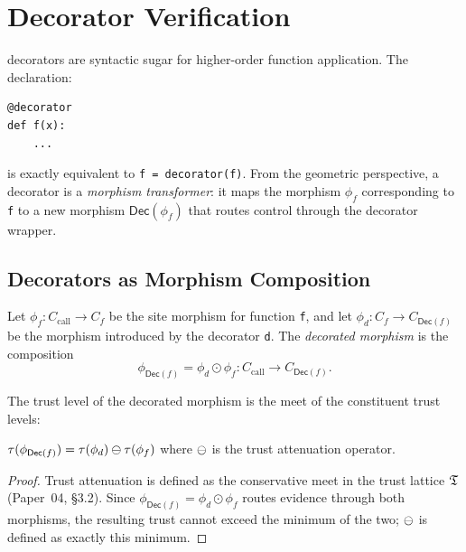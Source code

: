\documentclass[11pt]{article}
\newcommand{\Decor}{\mathsf{Dec}}              %
\newcommand{\compose}{\mathbin{\odot}}         %
\begin{document}
\section{Decorator Verification}\label{sec:decorator}

\Python{} decorators are syntactic sugar for higher-order function
application.  The declaration:
\begin{lstlisting}[style=jugeo-python]
@decorator
def f(x):
    ...
\end{lstlisting}
is exactly equivalent to \texttt{f = decorator(f)}.  From the
geometric perspective, a decorator is a \emph{morphism transformer}:
it maps the morphism $\phi_f$ corresponding to \texttt{f} to a
new morphism $\Decor(\phi_f)$ that routes control through the
decorator wrapper.

\subsection{Decorators as Morphism Composition}

\begin{definition}\label{def:decormor}
Let $\phi_f : C_{\mathrm{call}} \to C_f$ be the site morphism
for function \texttt{f}, and let
$\phi_d : C_f \to C_{\Decor(f)}$ be the morphism introduced by the
decorator \texttt{d}.  The \emph{decorated morphism} is the
composition
\[
  \phi_{\Decor(f)} = \phi_d \compose \phi_f :
  C_{\mathrm{call}} \to C_{\Decor(f)}.
\]
\end{definition}

The trust level of the decorated morphism is the meet of the
constituent trust levels:

\begin{proposition}\label{prop:decortrust}
$\tau(\phi_{\Decor(f)}) = \tau(\phi_d) \tatten \tau(\phi_f)$
where $\ominus$ is the trust attenuation operator.
\end{proposition}

\begin{proof}
Trust attenuation is defined as the conservative meet in the trust
lattice $\mathfrak{T}$ (Paper~04, \S3.2).  Since
$\phi_{\Decor(f)} = \phi_d \compose \phi_f$ routes evidence through
both morphisms, the resulting trust cannot exceed the minimum of the
two; $\ominus$ is defined as exactly this minimum.
\end{proof}
\end{document}
